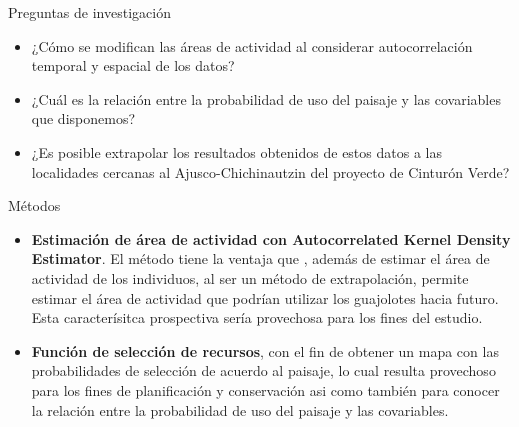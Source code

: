 \documentclass[11pt]{beamer}
\begin{document}
\begin{frame}{Preguntas de investigación}
	\begin{itemize}
		\item ¿Cómo se modifican las áreas de actividad al considerar autocorrelación temporal y espacial de los datos?
		\item ¿Cuál es la relación entre la probabilidad de uso del paisaje y las covariables que disponemos?
		\item ¿Es posible extrapolar los resultados obtenidos de estos datos a las localidades cercanas al Ajusco-Chichinautzin del proyecto de Cinturón Verde?
	\end{itemize}
\end{frame}

\begin{frame}{Métodos}\small

	\begin{itemize}
		\item \textbf{Estimación de área de actividad con Autocorrelated Kernel Density Estimator}. El método tiene la ventaja que , además de estimar el área de actividad de los individuos, al ser un método de extrapolación, permite estimar el área de actividad que podrían utilizar los guajolotes hacia futuro. Esta caracterísitca prospectiva sería provechosa para los fines del estudio.  
		\item \textbf{Función de selección de recursos}, con el fin de obtener un mapa con las probabilidades de selección de acuerdo al paisaje, lo cual resulta provechoso para los fines de planificación y conservación asi como también para conocer la relación entre la probabilidad de uso del paisaje y las covariables.
	\end{itemize}

\end{frame}
\end{document}
